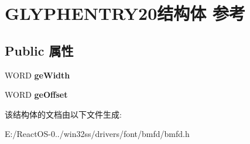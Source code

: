 \hypertarget{struct_g_l_y_p_h_e_n_t_r_y20}{}\section{G\+L\+Y\+P\+H\+E\+N\+T\+R\+Y20结构体 参考}
\label{struct_g_l_y_p_h_e_n_t_r_y20}
\subsection*{Public 属性}
\begin{DoxyCompactItemize}
\item 
\mbox{\label{struct_g_l_y_p_h_e_n_t_r_y20_ad7ba29027502826d5d4cd2767e51b509}} 
W\+O\+RD {\bfseries ge\+Width}
\item 
\mbox{\label{struct_g_l_y_p_h_e_n_t_r_y20_ae44ecb56ba5d0c5a91de5a3ecc403551}} 
W\+O\+RD {\bfseries ge\+Offset}
\end{DoxyCompactItemize}


该结构体的文档由以下文件生成\+:\begin{DoxyCompactItemize}
\item 
E\+:/\+React\+O\+S-\/0../win32ss/drivers/font/bmfd/bmfd.\+h\end{DoxyCompactItemize}
